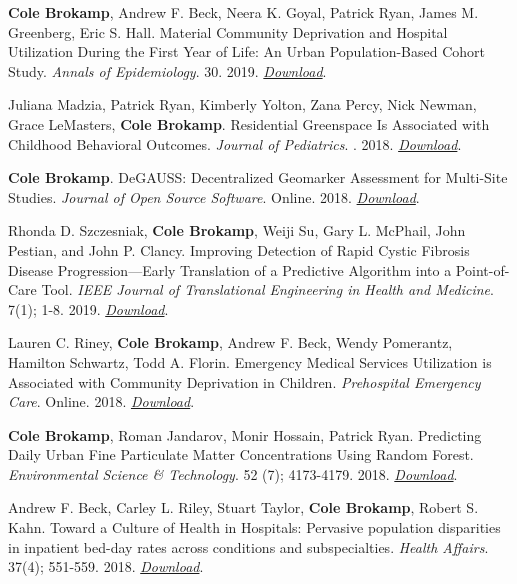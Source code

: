 \textbf{Cole Brokamp}, Andrew F. Beck, Neera K. Goyal, Patrick Ryan,
James M. Greenberg, Eric S. Hall. Material Community Deprivation and
Hospital Utilization During the First Year of Life: An Urban
Population-Based Cohort Study. \emph{Annals of Epidemiology}. 30. 2019.
\href{https://colebrokamp-website.s3.amazonaws.com/publications/Brokamp_AoE_2019.pdf}{\emph{Download}}.

Juliana Madzia, Patrick Ryan, Kimberly Yolton, Zana Percy, Nick Newman,
Grace LeMasters, \textbf{Cole Brokamp}. Residential Greenspace Is
Associated with Childhood Behavioral Outcomes. \emph{Journal of
Pediatrics}. . 2018.
\href{https://colebrokamp-website.s3.amazonaws.com/publications/Madzia_JPeds_2018.pdf}{\emph{Download}}.

\textbf{Cole Brokamp}. DeGAUSS: Decentralized Geomarker Assessment for
Multi-Site Studies. \emph{Journal of Open Source Software}. Online.
2018.
\href{https://colebrokamp-website.s3.amazonaws.com/publications/Brokamp_JOSS_2018.pdf}{\emph{Download}}.

Rhonda D. Szczesniak, \textbf{Cole Brokamp}, Weiji Su, Gary L. McPhail,
John Pestian, and John P. Clancy. Improving Detection of Rapid Cystic
Fibrosis Disease Progression---Early Translation of a Predictive
Algorithm into a Point-of-Care Tool. \emph{IEEE Journal of Translational
Engineering in Health and Medicine}. 7(1); 1-8. 2019.
\href{https://colebrokamp-website.s3.amazonaws.com/publications/Szczesniak_IEEE_2018.pdf}{\emph{Download}}.

Lauren C. Riney, \textbf{Cole Brokamp}, Andrew F. Beck, Wendy Pomerantz,
Hamilton Schwartz, Todd A. Florin. Emergency Medical Services
Utilization is Associated with Community Deprivation in Children.
\emph{Prehospital Emergency Care}. Online. 2018.
\href{https://colebrokamp-website.s3.amazonaws.com/publications/Riney_PrehospitalEmergencyCare_2018.pdf}{\emph{Download}}.

\textbf{Cole Brokamp}, Roman Jandarov, Monir Hossain, Patrick Ryan.
Predicting Daily Urban Fine Particulate Matter Concentrations Using
Random Forest. \emph{Environmental Science \& Technology}. 52 (7);
4173-4179. 2018.
\href{https://colebrokamp-website.s3.amazonaws.com/publications/Brokamp_EST_2018_onlineaheadofprint.pdf}{\emph{Download}}.

Andrew F. Beck, Carley L. Riley, Stuart Taylor, \textbf{Cole Brokamp},
Robert S. Kahn. Toward a Culture of Health in Hospitals: Pervasive
population disparities in inpatient bed-day rates across conditions and
subspecialties. \emph{Health Affairs}. 37(4); 551-559. 2018.
\href{https://colebrokamp-website.s3.amazonaws.com/publications/Beck_HealthAffairs_2018.pdf}{\emph{Download}}.

